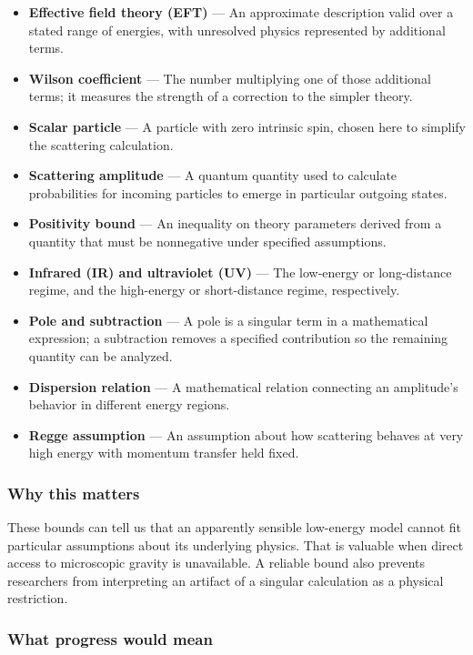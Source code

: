\documentclass[
  11pt,
]{article}
\begin{document}
\begin{itemize}
\item
  \textbf{Effective field theory (EFT)} --- An approximate description
  valid over a stated range of energies, with unresolved physics
  represented by additional terms.
\item
  \textbf{Wilson coefficient} --- The number multiplying one of those
  additional terms; it measures the strength of a correction to the
  simpler theory.
\item
  \textbf{Scalar particle} --- A particle with zero intrinsic spin,
  chosen here to simplify the scattering calculation.
\item
  \textbf{Scattering amplitude} --- A quantum quantity used to calculate
  probabilities for incoming particles to emerge in particular outgoing
  states.
\item
  \textbf{Positivity bound} --- An inequality on theory parameters
  derived from a quantity that must be nonnegative under specified
  assumptions.
\item
  \textbf{Infrared (IR) and ultraviolet (UV)} --- The low-energy or
  long-distance regime, and the high-energy or short-distance regime,
  respectively.
\item
  \textbf{Pole and subtraction} --- A pole is a singular term in a
  mathematical expression; a subtraction removes a specified
  contribution so the remaining quantity can be analyzed.
\item
  \textbf{Dispersion relation} --- A mathematical relation connecting an
  amplitude's behavior in different energy regions.
\item
  \textbf{Regge assumption} --- An assumption about how scattering
  behaves at very high energy with momentum transfer held fixed.
\end{itemize}

\subsubsection{Why this matters}

These bounds can tell us that an apparently sensible low-energy model
cannot fit particular assumptions about its underlying physics. That is
valuable when direct access to microscopic gravity is unavailable. A
reliable bound also prevents researchers from interpreting an artifact
of a singular calculation as a physical restriction.

\subsubsection{What progress would mean}
\end{document}
